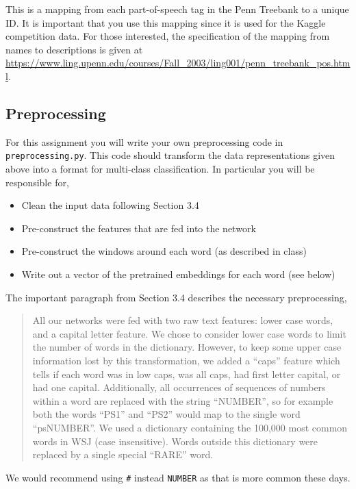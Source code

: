 \documentclass[11pt]{article}
\begin{document}
This is a mapping from each part-of-speech tag in the Penn Treebank to
a unique ID. It is important that you use this mapping since it 
is used for the Kaggle competition data. For those interested, the
specification of the mapping from names to descriptions is given at
\url{https://www.ling.upenn.edu/courses/Fall_2003/ling001/penn_treebank_pos.html}.


\subsection{Preprocessing}

For this assignment you will write your own preprocessing code
in \texttt{preprocessing.py}. This code should transform the
data representations given above into a format for multi-class
classification. In particular you will be responsible for,

\begin{itemize}
\item Clean the input data following Section 3.4
\item Pre-construct the features that are fed into the network
\item Pre-construct the windows around each word (as described in class)
\item Write out a vector of the pretrained embeddings for each word (see below)
\end{itemize}

The important paragraph from Section 3.4 describes the necessary
preprocessing,

\begin{quote}
  All our networks were fed with two raw text features: lower case
  words, and a capital letter feature. We chose to consider lower case
  words to limit the number of words in the dictionary. However, to
  keep some upper case information lost by this transformation, we
  added a “caps” feature which tells if each word was in low caps, was
  all caps, had first letter capital, or had one
  capital. Additionally, all occurrences of sequences of numbers
  within a word are replaced with the string “NUMBER”, so for example
  both the words “PS1” and “PS2” would map to the single word
  “psNUMBER”. We used a dictionary containing the 100,000 most common
  words in WSJ (case insensitive). Words outside this dictionary were
  replaced by a single special “RARE” word.
\end{quote}


We would recommend using \texttt{\#} instead \texttt{NUMBER} as that is more 
common these days.  
\end{document}
